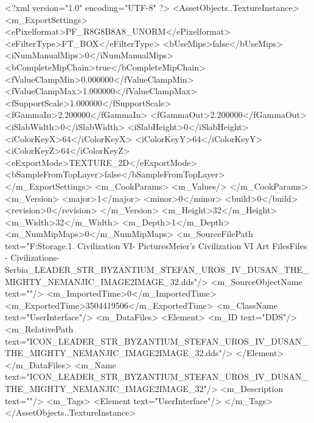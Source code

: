 <?xml version="1.0" encoding="UTF-8" ?>
<AssetObjects..TextureInstance>
	<m_ExportSettings>
		<ePixelformat>PF_R8G8B8A8_UNORM</ePixelformat>
		<eFilterType>FT_BOX</eFilterType>
		<bUseMips>false</bUseMips>
		<iNumManualMips>0</iNumManualMips>
		<bCompleteMipChain>true</bCompleteMipChain>
		<fValueClampMin>0.000000</fValueClampMin>
		<fValueClampMax>1.000000</fValueClampMax>
		<fSupportScale>1.000000</fSupportScale>
		<fGammaIn>2.200000</fGammaIn>
		<fGammaOut>2.200000</fGammaOut>
		<iSlabWidth>0</iSlabWidth>
		<iSlabHeight>0</iSlabHeight>
		<iColorKeyX>64</iColorKeyX>
		<iColorKeyY>64</iColorKeyY>
		<iColorKeyZ>64</iColorKeyZ>
		<eExportMode>TEXTURE_2D</eExportMode>
		<bSampleFromTopLayer>false</bSampleFromTopLayer>
	</m_ExportSettings>
	<m_CookParams>
		<m_Values/>
	</m_CookParams>
	<m_Version>
		<major>1</major>
		<minor>0</minor>
		<build>0</build>
		<revision>0</revision>
	</m_Version>
	<m_Height>32</m_Height>
	<m_Width>32</m_Width>
	<m_Depth>1</m_Depth>
	<m_NumMipMaps>0</m_NumMipMaps>
	<m_SourceFilePath text="F:\Mod Storage\2.1. Civilization VI\Mods\Archive - Pictures\Sid Meier's Civilization VI Art Files\Art Files - Civilizations\Civilization - Serbia\ICON_LEADER_STR_BYZANTIUM_STEFAN_UROS_IV_DUSAN_THE_MIGHTY_NEMANJIC_IMAGE2IMAGE_32.dds"/>
	<m_SourceObjectName text=""/>
	<m_ImportedTime>0</m_ImportedTime>
	<m_ExportedTime>3504419506</m_ExportedTime>
	<m_ClassName text="UserInterface"/>
	<m_DataFiles>
		<Element>
			<m_ID text="DDS"/>
			<m_RelativePath text="ICON_LEADER_STR_BYZANTIUM_STEFAN_UROS_IV_DUSAN_THE_MIGHTY_NEMANJIC_IMAGE2IMAGE_32.dds"/>
		</Element>
	</m_DataFiles>
	<m_Name text="ICON_LEADER_STR_BYZANTIUM_STEFAN_UROS_IV_DUSAN_THE_MIGHTY_NEMANJIC_IMAGE2IMAGE_32"/>
	<m_Description text=""/>
	<m_Tags>
		<Element text="UserInterface"/>
	</m_Tags>
</AssetObjects..TextureInstance>

